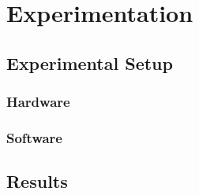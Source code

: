 \section{Experimentation}
\label{sec:experimentation}
    \subsection{Experimental Setup}
    \subsubsection{Hardware}
    \subsubsection{Software}
    \subsection{Results}
